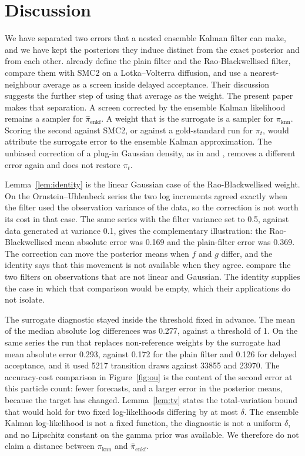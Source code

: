 \section{Discussion}
\label{sec:disc}

We have separated two errors that a nested ensemble Kalman filter can make, and we have kept the posteriors they induce distinct from the exact posterior and from each other. \citet{golightly2026} already define the plain filter and the Rao-Blackwellised filter, compare them with SMC2 on a Lotka--Volterra diffusion, and use a nearest-neighbour average as a screen inside delayed acceptance. Their discussion suggests the further step of using that average as the weight. The present paper makes that separation. A screen corrected by the ensemble Kalman likelihood remains a sampler for \(\hat{\pi}_{\mathrm{enkf}}\). A weight that is the surrogate is a sampler for \(\pi_{\mathrm{knn}}\). Scoring the second against SMC2, or against a gold-standard run for \(\pi_t\), would attribute the surrogate error to the ensemble Kalman approximation. The unbiased correction of a plug-in Gaussian density, as in \citet{drovandi2022} and \citet{temfack2026}, removes a different error again and does not restore \(\pi_t\).

Lemma~\ref{lem:identity} is the linear Gaussian case of the Rao-Blackwellised weight. On the Ornstein--Uhlenbeck series the two log increments agreed exactly when the filter used the observation variance of the data, so the correction is not worth its cost in that case. The same series with the filter variance set to 0.5, against data generated at variance 0.1, gives the complementary illustration: the Rao-Blackwellised mean absolute error was 0.169 and the plain-filter error was 0.369. The correction can move the posterior means when \(f\) and \(g\) differ, and the identity says that this movement is not available when they agree. \citet{golightly2026} compare the two filters on observations that are not linear and Gaussian. The identity supplies the case in which that comparison would be empty, which their applications do not isolate.

The surrogate diagnostic stayed inside the threshold fixed in advance. The mean of the median absolute log differences was 0.277, against a threshold of 1. On the same series the run that replaces non-reference weights by the surrogate had mean absolute error 0.293, against 0.172 for the plain filter and 0.126 for delayed acceptance, and it used 5217 transition draws against 33855 and 23970. The accuracy-cost comparison in Figure~\ref{fig:ou} is the content of the second error at this particle count: fewer forecasts, and a larger error in the posterior means, because the target has changed. Lemma~\ref{lem:tv} states the total-variation bound that would hold for two fixed log-likelihoods differing by at most \(\delta\). The ensemble Kalman log-likelihood is not a fixed function, the diagnostic is not a uniform \(\delta\), and no Lipschitz constant on the gamma prior was available. We therefore do not claim a distance between \(\pi_{\mathrm{knn}}\) and \(\hat{\pi}_{\mathrm{enkf}}\).

